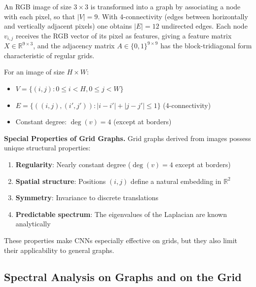 \begin{example}\label{ex:imagen_3x3_grafo}
An RGB image of size $3 \times 3$ is transformed into a graph by associating a node with each pixel, so that $|V| = 9$. With 4-connectivity (edges between horizontally and vertically adjacent pixels) one obtains $|E| = 12$ undirected edges. Each node $v_{i,j}$ receives the RGB vector of its pixel as features, giving a feature matrix $X \in \mathbb{R}^{9 \times 3}$, and the adjacency matrix $A \in \{0,1\}^{9 \times 9}$ has the block-tridiagonal form characteristic of regular grids.
\end{example}

\begin{definition}\label{def:grilla_como_grafo}
For an image of size \(H \times W\):
\begin{itemize}
	\item \(V = \{(i,j) : 0 \leq i < H, 0 \leq j < W\}\)
	\item \(E = \{((i,j), (i',j')) : |i-i'| + |j-j'| \leq 1\}\) (4-connectivity)
	\item Constant degree: \(\deg(v) = 4\) (except at borders)
\end{itemize}
\end{definition}

\textbf{Special Properties of Grid Graphs.} Grid graphs derived from images possess unique structural properties:
\begin{enumerate}
    \item \textbf{Regularity}: Nearly constant degree ($\deg(v) = 4$ except at borders)
    \item \textbf{Spatial structure}: Positions $(i,j)$ define a natural embedding in $\mathbb{R}^2$
    \item \textbf{Symmetry}: Invariance to discrete translations
    \item \textbf{Predictable spectrum}: The eigenvalues of the Laplacian are known analytically
\end{enumerate}

These properties make CNNs especially effective on grids, but they also limit their applicability to general graphs.

\subsection{Spectral Analysis on Graphs and on the Grid}\label{subsec:analisis_espectral_grafos}

